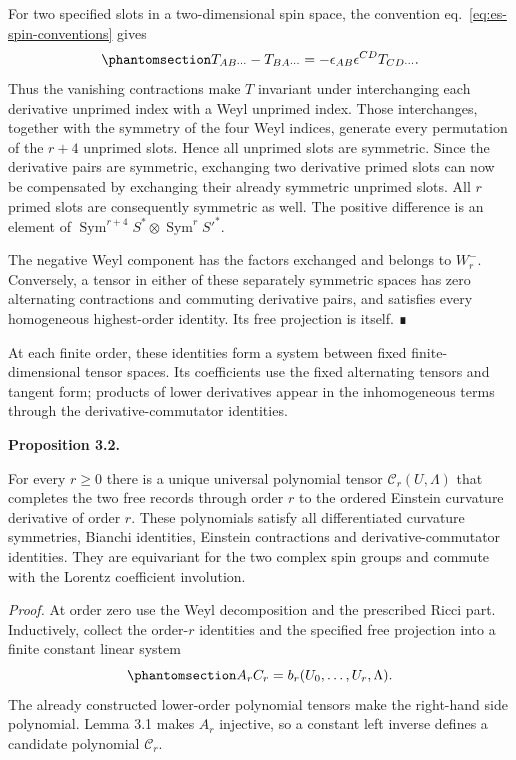 \documentclass[
  english,
  11pt,
  reqno]{amsart}
\makeatletter
\newcommand{\pandocstatementheading}[1]{%
  \par\addpenalty{\@beginparpenalty}%
  \addvspace{.5\baselineskip plus .2\baselineskip minus .2\baselineskip}%
  {\normalfont\bfseries #1\par}%
  \nobreak\@afterindenttrue\@afterheading
}
\makeatother
\begin{document}
For two specified slots in a two-dimensional spin space, the convention
eq.~\ref{eq:es-spin-conventions} gives
\begin{equation}\protect\phantomsection\label{eq:es-two-slot-symmetry}{
 T_{AB\cdots}-T_{BA\cdots}
   =-\epsilon_{AB}\epsilon^{CD}T_{CD\cdots}.
}\end{equation} Thus the vanishing contractions make \(T\) invariant
under interchanging each derivative unprimed index with a Weyl unprimed
index. Those interchanges, together with the symmetry of the four Weyl
indices, generate every permutation of the \(r+4\) unprimed slots. Hence
all unprimed slots are symmetric. Since the derivative pairs are
symmetric, exchanging two derivative primed slots can now be compensated
by exchanging their already symmetric unprimed slots. All \(r\) primed
slots are consequently symmetric as well. The positive difference is an
element of
\(\operatorname{Sym}^{r+4}S^*\otimes\operatorname{Sym}^rS'^*\).

The negative Weyl component has the factors exchanged and belongs to
\(W_r^-\). Conversely, a tensor in either of these separately symmetric
spaces has zero alternating contractions and commuting derivative pairs,
and satisfies every homogeneous highest-order identity. Its free
projection is itself. ∎

At each finite order, these identities form a system between fixed
finite-dimensional tensor spaces. Its coefficients use the fixed
alternating tensors and tangent form; products of lower derivatives
appear in the inhomogeneous terms through the derivative-commutator
identities.

\pandocstatementheading{\protect{}\label{prop:es-completion}Proposition 3.2.}

For every \(r\ge0\) there is a unique universal polynomial tensor
\(\mathcal C_r(U,\Lambda)\) that completes the two free records through
order \(r\) to the ordered Einstein curvature derivative of order \(r\).
These polynomials satisfy all differentiated curvature symmetries,
Bianchi identities, Einstein contractions and derivative-commutator
identities. They are equivariant for the two complex spin groups and
commute with the Lorentz coefficient involution.

\emph{Proof.} At order zero use the Weyl decomposition and the
prescribed Ricci part. Inductively, collect the order-\(r\) identities
and the specified free projection into a finite constant linear system
\begin{equation}\protect\phantomsection\label{eq:es-finite-completion-system}{
 A_r C_r=b_r(U_0,\ldots,U_r,\Lambda).
}\end{equation} The already constructed lower-order polynomial tensors
make the right-hand side polynomial. Lemma 3.1 makes \(A_r\) injective,
so a constant left inverse defines a candidate polynomial
\(\mathcal C_r\).
\end{document}
